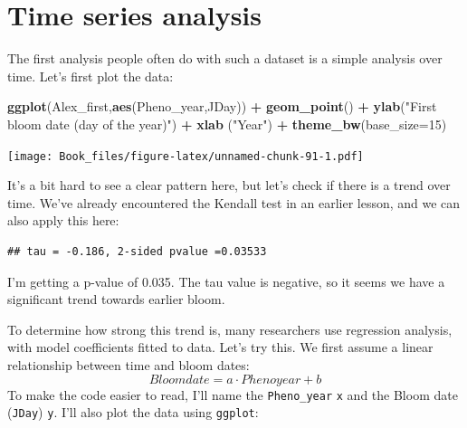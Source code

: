 \documentclass[
]{book}
\newenvironment{Shaded}{\begin{snugshade}}{\end{snugshade}}
\newcommand{\DataTypeTok}[1]{\textcolor[rgb]{0.13,0.29,0.53}{#1}}
\newcommand{\DecValTok}[1]{\textcolor[rgb]{0.00,0.00,0.81}{#1}}
\newcommand{\KeywordTok}[1]{\textcolor[rgb]{0.13,0.29,0.53}{\textbf{#1}}}
\newcommand{\NormalTok}[1]{#1}
\newcommand{\OperatorTok}[1]{\textcolor[rgb]{0.81,0.36,0.00}{\textbf{#1}}}
\newcommand{\StringTok}[1]{\textcolor[rgb]{0.31,0.60,0.02}{#1}}
\begin{document}
\hypertarget{time-series-analysis}{%
\section{Time series analysis}\label{time-series-analysis}}

The first analysis people often do with such a dataset is a simple analysis over time. Let's first plot the data:

\begin{Shaded}
\begin{Highlighting}[]
\KeywordTok{ggplot}\NormalTok{(Alex_first,}\KeywordTok{aes}\NormalTok{(Pheno_year,JDay)) }\OperatorTok{+}
\StringTok{  }\KeywordTok{geom_point}\NormalTok{() }\OperatorTok{+}
\StringTok{  }\KeywordTok{ylab}\NormalTok{(}\StringTok{"First bloom date (day of the year)"}\NormalTok{) }\OperatorTok{+}
\StringTok{  }\KeywordTok{xlab}\NormalTok{ (}\StringTok{"Year"}\NormalTok{) }\OperatorTok{+}
\StringTok{  }\KeywordTok{theme_bw}\NormalTok{(}\DataTypeTok{base_size=}\DecValTok{15}\NormalTok{)}
\end{Highlighting}
\end{Shaded}

\texttt{[image: Book\_files/figure-latex/unnamed-chunk-91-1.pdf]}

It's a bit hard to see a clear pattern here, but let's check if there is a trend over time. We've already encountered the Kendall test in an earlier lesson, and we can also apply this here:

\begin{Shaded}
\end{Shaded}

\begin{verbatim}
## tau = -0.186, 2-sided pvalue =0.03533
\end{verbatim}

I'm getting a p-value of 0.035. The tau value is negative, so it seems we have a significant trend towards earlier bloom.

To determine how strong this trend is, many researchers use regression analysis, with model coefficients fitted to data. Let's try this. We first assume a linear relationship between time and bloom dates: \[Bloomdate = a \cdot Phenoyear + b\]
To make the code easier to read, I'll name the \texttt{Pheno\_year} \texttt{x} and the Bloom date (\texttt{JDay}) \texttt{y}. I'll also plot the data using \texttt{ggplot}:
\end{document}
